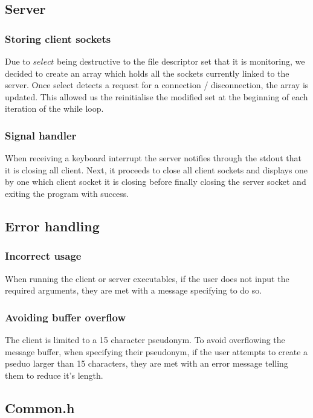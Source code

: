 \documentclass{article}
\begin{document}
\subsection{Server}

\subsubsection{Storing client sockets}
Due to $select$ being destructive to the file descriptor set that it is monitoring, we decided to create an array which holds all the sockets currently linked to the server. Once select detects a request for a connection / disconnection, the array is updated. This allowed us the reinitialise the modified set at the beginning of each iteration of the while loop.

\subsubsection{Signal handler}
When receiving a keyboard interrupt the server notifies through the stdout that it is closing all client. Next, it proceeds to close all client sockets and displays one by one which client socket it is closing before finally closing the server socket and exiting the program with success.

\subsection{Error handling}

\subsubsection{Incorrect usage}
When running the client or server executables, if the user does not input the required arguments, they are met with a message specifying to do so.

\subsubsection{Avoiding buffer overflow}
The client is limited to a 15 character pseudonym. To avoid overflowing the message buffer, when specifying their pseudonym, if the user attempts to create a pseduo larger than 15 characters, they are met with an error message telling them to reduce it's length.

\subsection{Common.h}
\end{document}
